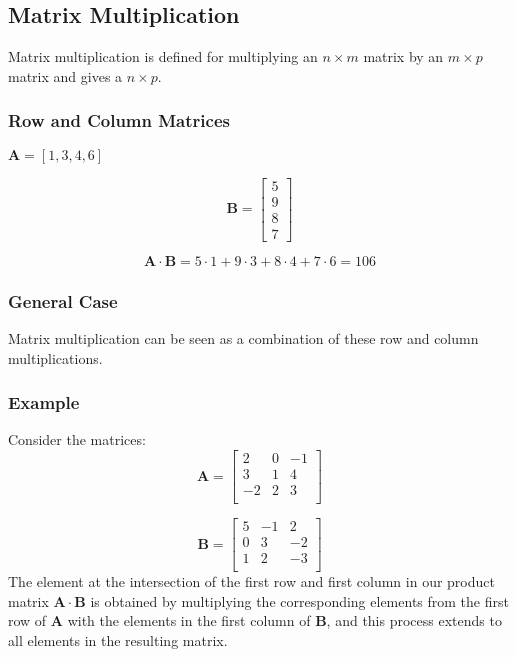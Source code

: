 \documentclass{article}
\begin{document}
\newpage

\subsection*{Matrix Multiplication}

Matrix multiplication is defined for multiplying an \(n \times m\) matrix by an \(m \times p\) matrix and gives a  \(n \times p\).

\subsubsection*{Row and Column Matrices}

\begin{center}
    \(\mathbf{A} = [1, 3, 4, 6]\) 
\end{center}

\[
\mathbf{B} =
\begin{bmatrix}
    5 \\
    9 \\
    8 \\
    7
\end{bmatrix}
\]

\[
\mathbf{A} \cdot \mathbf{B} = 5 \cdot 1 + 9 \cdot 3 + 8 \cdot 4 + 7 \cdot 6 = 106
\]


\subsubsection*{General Case}

Matrix multiplication can be seen as a combination of these row and column multiplications.

\subsubsection*{Example}

Consider the matrices:
\[
\mathbf{A} =
\begin{bmatrix}
    2 & 0 & -1 \\
    3 & 1 & 4 \\
    -2 & 2 & 3 \\
\end{bmatrix}
\]

\[
\mathbf{B} =
\begin{bmatrix}
    5 & -1 & 2 \\
    0 & 3 & -2 \\
    1 & 2 & -3 \\
\end{bmatrix}
\]
The element at the intersection of the first row and first column in our product matrix $\mathbf{A} \cdot \mathbf{B}$ is obtained by multiplying the corresponding elements from the first row of $\mathbf{A}$ with the elements in the first column of $\mathbf{B}$, and this process extends to all elements in the resulting matrix.
\end{document}
